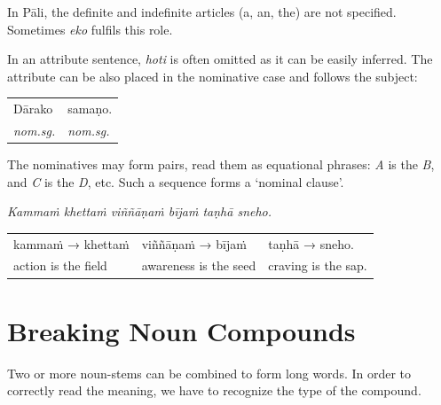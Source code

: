 \documentclass[11pt,oneside]{memoir}
\begin{document}
In Pāli, the definite and indefinite articles (a, an, the) are not specified. Sometimes \emph{eko} fulfils this role.

In an attribute sentence, \emph{hoti} is often omitted as it can be easily inferred.
The attribute can be also placed in the nominative case and follows the subject:

\begin{center}
\begin{tabular}{ll}
Dārako & samaṇo.\\[0pt]
\emph{nom.sg.} & \emph{nom.sg.}\\[0pt]
\end{tabular}
\end{center}

The nominatives may form pairs, read them as equational phrases: \emph{A} is the \emph{B},
and \emph{C} is the \emph{D}, etc. Such a sequence forms a `nominal clause'.

{\centering
\emph{Kammaṁ khettaṁ viññāṇaṁ bījaṁ taṇhā sneho.}
\par}

\begin{center}
\begin{tabular}{lll}
kammaṁ → khettaṁ & viññāṇaṁ → bījaṁ & taṇhā → sneho.\\[0pt]
action is the field & awareness is the seed & craving is the sap.\\[0pt]
\end{tabular}
\end{center}

\section{Breaking Noun Compounds}
\label{sec:org201fb6d}

Two or more noun-stems can be combined to form long words. In order to correctly
read the meaning, we have to recognize the type of the compound.
\end{document}
